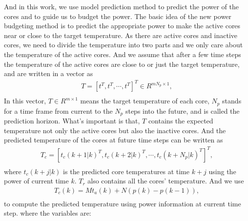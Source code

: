  
And in this work, we use model prediction method to predict the power of the cores and to guide us to budget the power.
   The basic idea of the new power budgeting method is to predict the appropriate power to make the active cores near or close to the target temperature. As there are active cores and inactive cores, we need to divide the temperature into two parts and we only care about the temperature of the active cores.  
  And we assume that after a few time steps the temperature of the active cores are close to or just the target temperature, and are written in a vector as 
\begin{equation}
\label{G}
\begin{split}
T=[t^T,t^T,\dotsb,t^T]^T \in R^{mN_p \times 1},\\
\end{split}
\end{equation}
In this vector, $T \in R^{m\times 1} $ means the target temperature of each core, $N_p$ stands for a time frame from current to the $N_p$ steps into the future, and is called the prediction horizon. What's important is that, $T$ contains the expected temperature not only the active cores but also the inactive cores. 
And the predicted temperature of the cores at future time steps can be written as
\begin{equation}
\label{y}
\begin{split}
T_c=[t_c(k+1|k)^T,t_c(k+2|k)^T,\dotsb,t_c(k+N_p|k)^T]^T, \\
\end{split}
\end{equation}
where $t_c(k+j|k)$ is the predicted core temperatures at time $k+j$ using the power of current time $k$.
$T_r$ also contains all the cores' temperature.
 And we use 
\begin{equation}
\label{Y}
\begin{split}
T_c(k)=Mt_a(k)+ N( p(k)-p(k-1)),\\
\end{split}
\end{equation}
 to compute the predicted temperature using power information at current time step.
where the variables are: 
